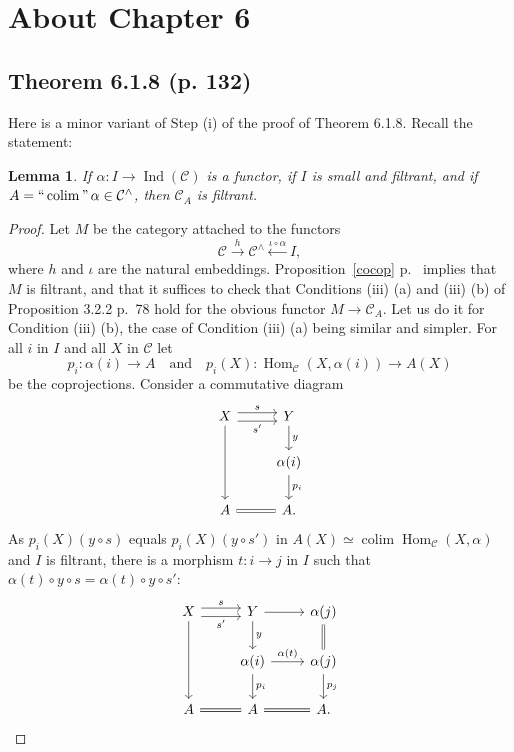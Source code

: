 \documentclass[12pt]{article}%
\newtheorem{lem}[thm]{Lemma}
\theoremstyle{remark}
\theoremstyle{definition}
\newcommand{\C}{\mathcal C}
\DeclareMathOperator*{\colim}{colim}
\DeclareMathOperator*{\ic}{``\colim"}
\DeclareMathOperator{\Hom}{Hom}%
\DeclareMathOperator{\Ind}{Ind}
\begin{document}

\section{About Chapter 6}

\subsection{Theorem 6.1.8 (p. 132)}

Here is a minor variant of Step (i) of the proof of Theorem 6.1.8. Recall the statement: 

\begin{lem} 
If $\alpha:I\to\Ind(\C)$ is a functor, if $I$ is small and filtrant, and if $A=\ic\alpha\in\C^\wedge$, then $\C_A$ is filtrant. 
\end{lem} 

\begin{proof}
Let $M$ be the category attached to the functors 
$$
\C\xrightarrow h\C^\wedge\xleftarrow{\iota\circ\alpha}I,
$$ 
where $h$ and $\iota$ are the natural embeddings. Proposition~\ref{cocop} p.~\pageref{cocop} implies that $M$ is filtrant, and that it suffices to check that Conditions (iii) (a) and (iii) (b) of Proposition 3.2.2 p.~78 hold for the obvious functor $M\to\C_A$. Let us do it for Condition (iii) (b), the case of Condition (iii) (a) being similar and simpler. For all $i$ in $I$ and all $X$ in $\C$ let 
$$
p_i:\alpha(i)\to A\quad\text{and}\quad p_i(X):\Hom_\C(X,\alpha(i))\to A(X)
$$
be the coprojections. Consider a commutative diagram 
$$
\begin{tikzcd}
X\ar{dd}\ar[yshift=0.7ex]{r}{s}\ar[yshift=-0.7ex]{r}[swap]{s'}&Y\ar{d}{y}\\ 
{}&\alpha(i)\ar{d}{p_i}\\ 
A\ar[equal]{r}&A.
\end{tikzcd}
$$ 
As $p_i(X)(y\circ s)$ equals $p_i(X)(y\circ s')$ in $A(X)\simeq\colim\Hom_\C(X,\alpha)$ and $I$ is filtrant, there is a morphism $t:i\to j$ in $I$ such that $\alpha(t)\circ y\circ s=\alpha(t)\circ y\circ s'$:
$$
\begin{tikzcd}
X\ar{dd}\ar[yshift=0.7ex]{r}{s}\ar[yshift=-0.7ex]{r}[swap]{s'}&Y\ar{d}{y}\ar{r}&\alpha(j)\ar[equal]{d}\\ 
{}&\alpha(i)\ar{d}{p_i}\ar{r}{\alpha(t)}&\alpha(j)\ar{d}{p_j}\\ 
A\ar[equal]{r}&A\ar[equal]{r}&A.
\end{tikzcd}
$$
\end{proof}
\end{document}
